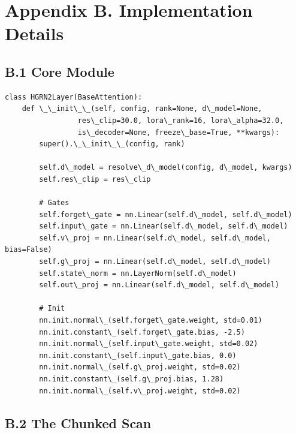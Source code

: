 \section{Appendix B. Implementation Details}

\subsection{B.1 Core Module}

\begin{lstlisting}
class HGRN2Layer(BaseAttention):
    def \_\_init\_\_(self, config, rank=None, d\_model=None, 
                 res\_clip=30.0, lora\_rank=16, lora\_alpha=32.0, 
                 is\_decoder=None, freeze\_base=True, **kwargs):
        super().\_\_init\_\_(config, rank)
        
        self.d\_model = resolve\_d\_model(config, d\_model, kwargs)
        self.res\_clip = res\_clip
        
        # Gates
        self.forget\_gate = nn.Linear(self.d\_model, self.d\_model)
        self.input\_gate = nn.Linear(self.d\_model, self.d\_model)
        self.v\_proj = nn.Linear(self.d\_model, self.d\_model, bias=False)
        self.g\_proj = nn.Linear(self.d\_model, self.d\_model)
        self.state\_norm = nn.LayerNorm(self.d\_model)
        self.out\_proj = nn.Linear(self.d\_model, self.d\_model)
        
        # Init
        nn.init.normal\_(self.forget\_gate.weight, std=0.01)
        nn.init.constant\_(self.forget\_gate.bias, -2.5)
        nn.init.normal\_(self.input\_gate.weight, std=0.02)
        nn.init.constant\_(self.input\_gate.bias, 0.0)
        nn.init.normal\_(self.g\_proj.weight, std=0.02)
        nn.init.constant\_(self.g\_proj.bias, 1.28)
        nn.init.normal\_(self.v\_proj.weight, std=0.02)
\end{lstlisting}

\subsection{B.2 The Chunked Scan}

